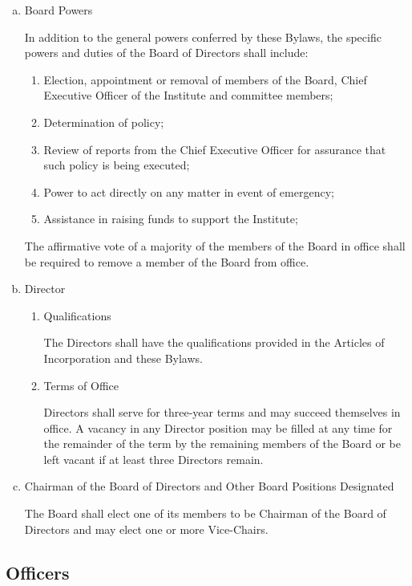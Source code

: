 \begin{enumerate}[(a)]
\item Board Powers

In addition to the general powers conferred by these Bylaws, the specific powers and duties of the Board of Directors shall include:

\begin{enumerate}
\item Election, appointment or removal of members of the Board, Chief Executive Officer of the Institute and committee members; 
\item Determination of policy;
\item Review of reports from the Chief Executive Officer for assurance that such policy is being executed;
\item Power to act directly on any matter in event of emergency;
\item Assistance in raising funds to support the Institute;
\end{enumerate}

The affirmative vote of a majority of the members of the Board in office shall be required to remove a member of the Board from office.

\item Director

\begin{enumerate}
\item Qualifications

The Directors shall have the qualifications provided in the Articles of Incorporation and these Bylaws. 

\item Terms of Office

Directors shall serve for three-year terms and may succeed themselves in office.  A vacancy in any Director position may be filled at any time for the remainder of the term by the remaining members of the Board or be left vacant if at least three Directors remain.

\end{enumerate}

\item Chairman of the Board of Directors and Other Board Positions Designated

The Board shall elect one of its members to be Chairman of the Board of Directors and may elect one or more Vice-Chairs.

\end{enumerate}

\subsection{Officers}

